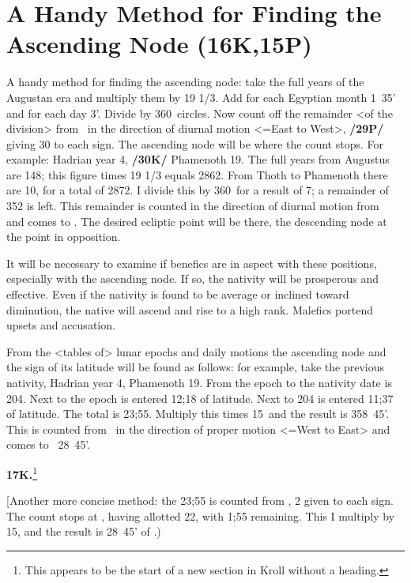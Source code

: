 \section{A Handy Method for Finding the Ascending Node (16K,15P)}
A handy method for finding the ascending node: take the full years of the Augustan era and multiply them by 19 1/3. Add for each Egyptian month 1\deg\, 35' and for each day 3'. Divide by 360\deg\, circles. Now count off the remainder <of the division> from \Cancer\, in the direction of diurnal motion <=East to West>, \textbf{/29P/} giving 30 to each sign. The ascending node will be where the count stops. For example: Hadrian year 4, \textbf{/30K/} Phamenoth 19. The full years from Augustus are 148; this figure times 19 1/3 equals 2862. From Thoth to Phamenoth there are 10\deg, for a total of 2872. I divide this by 360\deg\, for a result of 7; a remainder of 352 is left. This remainder is counted in the direction of diurnal motion from \Cancer\, and comes to \deg. The desired ecliptic point will be there, the descending node at the point in opposition.

\mndl[0.2cm]
It will be necessary to examine if benefics are in aspect with these positions, especially with the ascending node. If so, the nativity will be prosperous and effective. Even if the nativity is found to be average or inclined toward diminution, the native will ascend and rise to a high rank. Malefics portend
upsets and accusation.

From the <tables of> lunar epochs and daily motions the ascending node and the sign of its latitude will be found as follows: for example, take the previous nativity, Hadrian year 4, Phamenoth 19. From the epoch to the nativity date is 204. Next to the epoch is entered 12;18 of latitude. Next to 204 is entered 11;37 of latitude. The total is 23;55. Multiply this times 15\deg\, and the result is 358\deg\, 45'. This is counted from \Leo\, in the direction of proper motion <=West to East> and comes to \Cancer\, 28\deg\, 45'.

\textbf{17K.}\footnote{This appears to be the start of a new section in Kroll without a heading.}
\setcounter{section}{17}

[Another more concise method: the 23;55 is counted from \Leo, 2 given to each sign. The count stops at \Gemini, having allotted 22, with 1;55 remaining. This I multiply by 15\deg, and the result is 28\deg\, 45' of \Cancer.)

